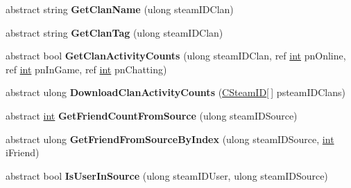 \begin{DoxyCompactItemize}
\item 
\hypertarget{classValve_1_1Steamworks_1_1ISteamFriends_abe32d4da4594a32b33732688c866962d}{}abstract string {\bfseries Get\+Clan\+Name} (ulong steam\+I\+D\+Clan)\label{classValve_1_1Steamworks_1_1ISteamFriends_abe32d4da4594a32b33732688c866962d}

\item 
\hypertarget{classValve_1_1Steamworks_1_1ISteamFriends_a08c6d8671faafbdca60b3102345c4187}{}abstract string {\bfseries Get\+Clan\+Tag} (ulong steam\+I\+D\+Clan)\label{classValve_1_1Steamworks_1_1ISteamFriends_a08c6d8671faafbdca60b3102345c4187}

\item 
\hypertarget{classValve_1_1Steamworks_1_1ISteamFriends_a328ca7b0661384c05154e79b9818e7b8}{}abstract bool {\bfseries Get\+Clan\+Activity\+Counts} (ulong steam\+I\+D\+Clan, ref \hyperlink{SDL__thread_8h_a6a64f9be4433e4de6e2f2f548cf3c08e}{int} pn\+Online, ref \hyperlink{SDL__thread_8h_a6a64f9be4433e4de6e2f2f548cf3c08e}{int} pn\+In\+Game, ref \hyperlink{SDL__thread_8h_a6a64f9be4433e4de6e2f2f548cf3c08e}{int} pn\+Chatting)\label{classValve_1_1Steamworks_1_1ISteamFriends_a328ca7b0661384c05154e79b9818e7b8}

\item 
\hypertarget{classValve_1_1Steamworks_1_1ISteamFriends_ab990863096f770c71ab70edb4612997d}{}abstract ulong {\bfseries Download\+Clan\+Activity\+Counts} (\hyperlink{structValve_1_1Steamworks_1_1CSteamID}{C\+Steam\+I\+D}\mbox{[}$\,$\mbox{]} psteam\+I\+D\+Clans)\label{classValve_1_1Steamworks_1_1ISteamFriends_ab990863096f770c71ab70edb4612997d}

\item 
\hypertarget{classValve_1_1Steamworks_1_1ISteamFriends_a222b1b89a7b4712abbe08ef1384195fa}{}abstract \hyperlink{SDL__thread_8h_a6a64f9be4433e4de6e2f2f548cf3c08e}{int} {\bfseries Get\+Friend\+Count\+From\+Source} (ulong steam\+I\+D\+Source)\label{classValve_1_1Steamworks_1_1ISteamFriends_a222b1b89a7b4712abbe08ef1384195fa}

\item 
\hypertarget{classValve_1_1Steamworks_1_1ISteamFriends_abf8cb9eb5ab9ade19d2d96169948bde0}{}abstract ulong {\bfseries Get\+Friend\+From\+Source\+By\+Index} (ulong steam\+I\+D\+Source, \hyperlink{SDL__thread_8h_a6a64f9be4433e4de6e2f2f548cf3c08e}{int} i\+Friend)\label{classValve_1_1Steamworks_1_1ISteamFriends_abf8cb9eb5ab9ade19d2d96169948bde0}

\item 
\hypertarget{classValve_1_1Steamworks_1_1ISteamFriends_aa35dea284366e61fdf9ed48fe85a6d7e}{}abstract bool {\bfseries Is\+User\+In\+Source} (ulong steam\+I\+D\+User, ulong steam\+I\+D\+Source)\label{classValve_1_1Steamworks_1_1ISteamFriends_aa35dea284366e61fdf9ed48fe85a6d7e}


\end{DoxyCompactItemize}
